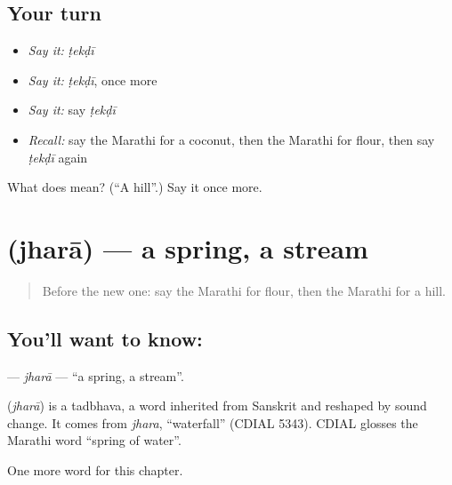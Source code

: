 \subsection*{Your turn}
\begin{itemize}
\raggedright
  \item \emph{Say it:} \emph{ṭekḍī}
  \item \emph{Say it:} \emph{ṭekḍī}, once more
  \item \emph{Say it:} say \emph{ṭekḍī}
  \item \emph{Recall:} say the Marathi for a coconut, then the Marathi for flour, then say \emph{ṭekḍī} again
\end{itemize}

\begin{tcolorbox}[breakable,colback=teal!4,colframe=teal!35!black,title={Before you move on}]
What does  mean? (\textquotedblleft{}A hill\textquotedblright{}.) Say it once more.
\end{tcolorbox}
\section[\texorpdfstring{\mr{झरा} (jharā)}{झरा (jharā)}]{ (jharā) — a spring, a stream}

\label{lesson:MR-C139-jhara}



\begin{quote}
Before the new one: say the Marathi for flour, then the Marathi for a hill.
\end{quote}

\subsection*{You'll want to know: }
\textbf{} — \emph{jharā} — \textquotedblleft{}a spring, a stream\textquotedblright{}.

\begin{cousinweb}
\textbf{} (\emph{jharā}) is a tadbhava, a word inherited from Sanskrit and reshaped by sound change. It comes from \emph{jhara}, \textquotedblleft{}waterfall\textquotedblright{} (CDIAL 5343). CDIAL glosses the Marathi word \textquotedblleft{}spring of water\textquotedblright{}.
\end{cousinweb}

\begin{grammarlens}[title={What you've built}]
One more word for this chapter.
\end{grammarlens}

